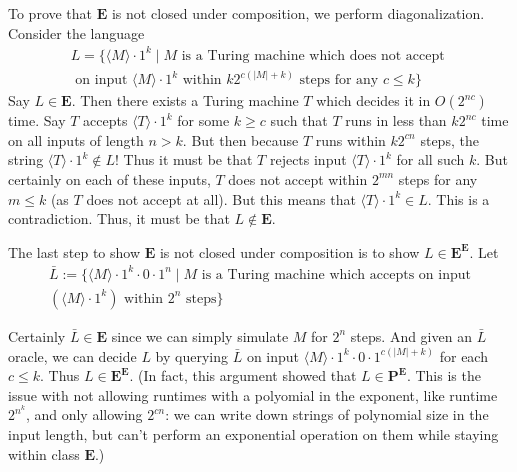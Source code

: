 \documentclass{article}
\renewcommand{\P}{\mathbf{P}}
\newcommand{\E}{\mathbf{E}}
\begin{document}
	To prove that $\E$ is not closed under composition, we perform diagonalization. Consider the language
	\begin{multline*}
		L = \{
		\langle M \rangle \cdot 1^k \mid M \text{ is a Turing machine which does not accept } \\ \text{ on input } \langle M \rangle \cdot 1^k \text{ within } k 2^{c (|M| + k)} \text{ steps for any } c \leq k
	\}
	\end{multline*}
	Say $L \in \E$.  Then there exists a Turing machine $T$ which decides it in $O(2^{nc})$ time.  Say $T$ accepts $\langle T \rangle \cdot 1^k$ for some $k \geq c$ such that $T$ runs in less than $k 2^{nc}$ time on all inputs of length $n > k$.  But then because $T$ runs within $k2^{cn}$ steps, the string $\langle T \rangle \cdot 1^k \notin L$!  Thus it must be that $T$ rejects input $\langle T \rangle \cdot 1^k$ for all such $k$.  But certainly on each of these inputs, $T$ does not accept within $2^{mn}$ steps for any $m \leq k$ (as $T$ does not accept at all).  But this means that $\langle T \rangle \cdot 1^k \in L$.  This is a contradiction.  Thus, it must be that $L \notin \E$.

	The last step to show $\E$ is not closed under composition is to show $L \in \E^\E$. Let
	\begin{multline*}
	\bar{L} := \{ \langle M \rangle \cdot 1^k \cdot 0 \cdot 1^n \mid M \text{ is a Turing machine which accepts on input}
	\\ (\langle M \rangle \cdot 1^k) \text{ within } 2^n \text{ steps}
	\}
	\end{multline*}

	Certainly $\bar{L} \in \E$ since we can simply simulate $M$ for $2^n$ steps.  And given an $\bar{L}$ oracle, we can decide $L$ by querying $\bar{L}$ on input $\langle M \rangle \cdot 1^k \cdot 0 \cdot 1^{c (|M| + k)}$ for each $c \leq k$.
	Thus $L \in \E^\E$. (In fact, this argument showed that $L \in \P^\E$.  This is the issue with not allowing runtimes with a polyomial in the exponent, like runtime $2^{n^k}$, and only allowing $2^{cn}$: we can write down strings of polynomial size in the input length, but can't perform an exponential operation on them while staying within class $\E$.)
\end{document}
